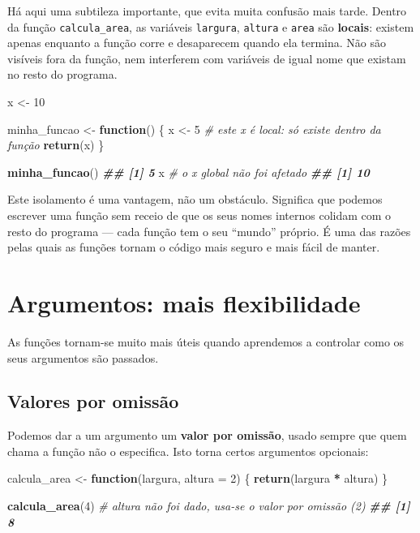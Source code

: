 \documentclass[
  portuguese,
  11pt,
  openany]{book}
\newenvironment{Shaded}{\begin{snugshade}}{\end{snugshade}}
\newcommand{\AttributeTok}[1]{\textcolor[rgb]{0.13,0.29,0.53}{#1}}
\newcommand{\CommentTok}[1]{\textcolor[rgb]{0.56,0.35,0.01}{\textit{#1}}}
\newcommand{\ControlFlowTok}[1]{\textcolor[rgb]{0.13,0.29,0.53}{\textbf{#1}}}
\newcommand{\DecValTok}[1]{\textcolor[rgb]{0.00,0.00,0.81}{#1}}
\newcommand{\DocumentationTok}[1]{\textcolor[rgb]{0.56,0.35,0.01}{\textbf{\textit{#1}}}}
\newcommand{\FunctionTok}[1]{\textcolor[rgb]{0.13,0.29,0.53}{\textbf{#1}}}
\newcommand{\NormalTok}[1]{#1}
\newcommand{\OtherTok}[1]{\textcolor[rgb]{0.56,0.35,0.01}{#1}}
\newcommand{\SpecialCharTok}[1]{\textcolor[rgb]{0.81,0.36,0.00}{\textbf{#1}}}
\begin{document}
Há aqui uma subtileza importante, que evita muita confusão mais tarde. Dentro da
função \texttt{calcula\_area}, as variáveis \texttt{largura}, \texttt{altura} e \texttt{area} são \textbf{locais}:
existem apenas enquanto a função corre e desaparecem quando ela termina. Não são
visíveis fora da função, nem interferem com variáveis de igual nome que existam no
resto do programa.

\begin{Shaded}
\begin{Highlighting}[]
\NormalTok{x }\OtherTok{\textless{}{-}} \DecValTok{10}

\NormalTok{minha\_funcao }\OtherTok{\textless{}{-}} \ControlFlowTok{function}\NormalTok{() \{}
\NormalTok{  x }\OtherTok{\textless{}{-}} \DecValTok{5}        \CommentTok{\# este \textquotesingle{}x\textquotesingle{} é local: só existe dentro da função}
  \FunctionTok{return}\NormalTok{(x)}
\NormalTok{\}}

\FunctionTok{minha\_funcao}\NormalTok{()}
\DocumentationTok{\#\# [1] 5}
\NormalTok{x               }\CommentTok{\# o \textquotesingle{}x\textquotesingle{} global não foi afetado}
\DocumentationTok{\#\# [1] 10}
\end{Highlighting}
\end{Shaded}

Este isolamento é uma vantagem, não um obstáculo. Significa que podemos escrever
uma função sem receio de que os seus nomes internos colidam com o resto do
programa --- cada função tem o seu ``mundo'' próprio. É uma das razões pelas quais as
funções tornam o código mais seguro e mais fácil de manter.

\section{Argumentos: mais flexibilidade}\label{argumentos-mais-flexibilidade}

As funções tornam-se muito mais úteis quando aprendemos a controlar como os seus
argumentos são passados.

\subsection{Valores por omissão}\label{valores-por-omissuxe3o}

Podemos dar a um argumento um \textbf{valor por omissão}, usado sempre que quem chama a
função não o especifica. Isto torna certos argumentos opcionais:

\begin{Shaded}
\begin{Highlighting}[]
\NormalTok{calcula\_area }\OtherTok{\textless{}{-}} \ControlFlowTok{function}\NormalTok{(largura, }\AttributeTok{altura =} \DecValTok{2}\NormalTok{) \{}
  \FunctionTok{return}\NormalTok{(largura }\SpecialCharTok{*}\NormalTok{ altura)}
\NormalTok{\}}

\FunctionTok{calcula\_area}\NormalTok{(}\DecValTok{4}\NormalTok{)     }\CommentTok{\# \textquotesingle{}altura\textquotesingle{} não foi dado, usa{-}se o valor por omissão (2)}
\DocumentationTok{\#\# [1] 8}
\end{Highlighting}
\end{Shaded}
\end{document}

